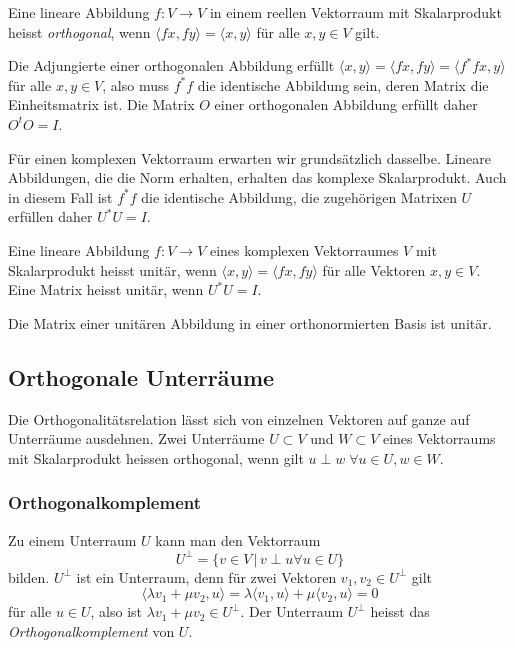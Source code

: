 \begin{definition}
Eine lineare Abbildung $f\colon V\to V$ in einem reellen
Vektorraum mit Skalarprodukt heisst {\em orthogonal}, wenn
$\langle fx,fy\rangle = \langle x,y\rangle$ für alle
$x,y\in V$ gilt.
%
%
\end{definition}

Die Adjungierte einer orthogonalen Abbildung erfüllt
$\langle x,y\rangle = \langle fx,fy\rangle = \langle f^*f x, y\rangle$
für alle $x,y\in V$, also muss $f^*f$ die identische Abbildung sein,
deren Matrix die Einheitsmatrix ist.
Die Matrix $O$ einer orthogonalen Abbildung erfüllt daher $O^tO=I$.

Für einen komplexen Vektorraum erwarten wir grundsätzlich dasselbe.
Lineare Abbildungen, die die Norm erhalten, erhalten das komplexe
Skalarprodukt.
Auch in diesem Fall ist $f^*f$ die identische Abbildung, die zugehörigen
Matrixen $U$ erfüllen daher $U^*U=I$.

\begin{definition}
Eine lineare Abbildung $f\colon V\to V$ eines komplexen Vektorraumes
$V$ mit Skalarprodukt heisst unitär,
wenn $\langle x,y\rangle = \langle fx,fy\rangle$ für alle Vektoren $x,y\in V$.
Eine Matrix heisst unitär, wenn $U^*U=I$.
%
%
\end{definition}

Die Matrix einer unitären Abbildung in einer orthonormierten Basis ist unitär.

\subsection{Orthogonale Unterräume
\label{buch:subsection:orthogonale-unterraeume}}
Die Orthogonalitätsrelation lässt sich von einzelnen Vektoren auf ganze
auf Unterräume ausdehnen.
Zwei Unterräume $U\subset V$ und $W\subset V$ eines Vektorraums mit
Skalarprodukt heissen orthogonal, wenn gilt
\(
u\perp w\;\forall u\in U,w\in W
\).

\subsubsection{Orthogonalkomplement}
Zu einem Unterraum $U$ kann man den Vektorraum
\[
U^\perp = \{ v\in V\,|\, v\perp u\forall u\in U\}
\]
bilden.
$U^\perp$ ist ein Unterraum, denn für zwei Vektoren
$v_1,v_2\in U^\perp$ gilt
\[
\langle \lambda v_1+\mu v_2,u\rangle
=
\lambda \langle v_1,u\rangle + \mu \langle v_2,u\rangle
=
0
\]
für alle $u\in U$, also ist $\lambda v_1+\mu v_2\in U^\perp$.
Der Unterraum $U^\perp$ heisst das {\em Orthogonalkomplement}
von $U$.
%

